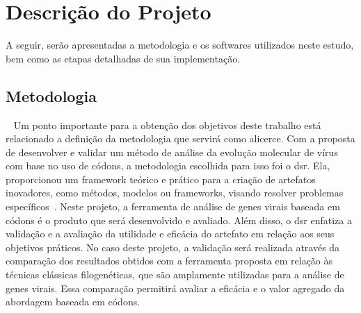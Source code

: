 
\chapter{Descrição do Projeto}




A seguir, serão apresentadas a metodologia e os softwares utilizados neste estudo, bem como as etapas detalhadas de sua implementação.

\section{Metodologia}~\label{sec:metodologia}
Um ponto importante para a obtenção dos objetivos deste trabalho está relacionado a definição da metodologia que servirá como alicerce. Com a proposta de desenvolver e validar um método de análise da evolução molecular de vírus com base no uso de códons, a metodologia escolhida para isso foi o \gls{dsr}. Ela, proporcionou um framework teórico e prático para a criação de artefatos inovadores, como métodos, modelos ou frameworks, visando resolver problemas específicos~\cite{peffers_dsr_2007}. Neste projeto, a ferramenta de análise de genes virais baseada em códons é o produto que será desenvolvido e avaliado. Além disso, o \gls{dsr} enfatiza a validação e a avaliação da utilidade e eficácia do artefato em relação aos seus objetivos práticos. No caso deste projeto, a validação será realizada através da comparação dos resultados obtidos com a ferramenta proposta em relação às técnicas clássicas filogenéticas, que são amplamente utilizadas para a análise de genes virais. Essa comparação permitirá avaliar a eficácia e o valor agregado da abordagem baseada em códons.


